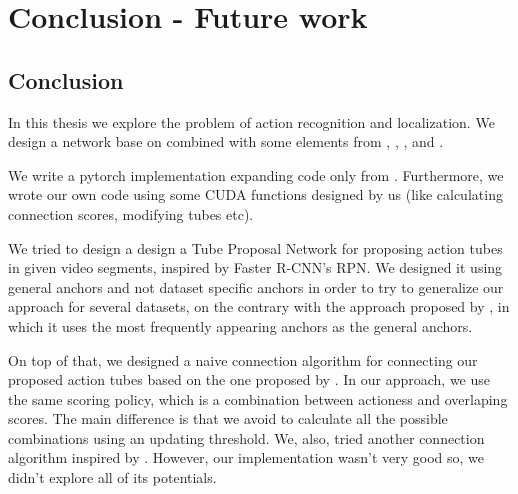 


% 

\chapter{Conclusion - Future work}

\section{Conclusion}
In this thesis we explore the problem of action recognition and localization. We design a network base on \cite{DBLP:journals/corr/HouCS17}
combined with some elements from \cite{DBLP:journals/corr/abs-1712-09184}, \cite{Ren:2015:FRT:2969239.2969250}, \cite{Girshick:2015:FR:2919332.2920125},
\cite{DBLP:journals/corr/abs-1903-00304} and \cite{hara3dcnns}. \par

We write a pytorch implementation expanding code only from \cite{jjfaster2rcnn}. Furthermore, we wrote our own code using some CUDA functions designed by us (like
calculating connection scores, modifying tubes etc). \par

We tried to design a design a Tube Proposal Network for proposing action tubes in given video segments, inspired by Faster R-CNN's RPN.
We designed it using general anchors and not dataset specific anchors in order to try to generalize our approach for several datasets, on the contrary with
the approach proposed by \cite{DBLP:journals/corr/abs-1712-09184}, in which it uses the most frequently appearing anchors as the general anchors. \par

On top of that, we designed a naive connection algorithm for connecting  our proposed action tubes based on the one proposed by \cite{DBLP:journals/corr/abs-1712-09184}.
In our approach, we use the same scoring policy, which is a combination between actioness and overlaping scores. The main difference is that we avoid to calculate
all the possible combinations using an updating threshold. We, also, tried another connection algorithm inspired by \cite{DBLP:journals/corr/abs-1903-00304}. However,
our implementation wasn't very good so, we didn't explore all of its potentials. \par


